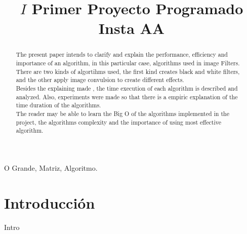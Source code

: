 \documentclass[conference]{IEEEtran}
\begin{document}
\title{$ I$ Primer Proyecto Programado Insta AA}
\author{
\and
{}
}
\maketitle
\begin{abstract}
The present paper intends to clarify and explain the performance, efficiency and importance of an algorithm, in this particular case, algorithms used in image Filters. \\ There are two kinds of algortihms used, the first kind creates black and white filters, and the other apply image convulsion to create different effects. \\Besides the explaining made , the time execution of each algorithm is described and analyzed. Also, experiments were made so that there is a empiric explanation of the time duration of the algorithms. \\The reader may be able to learn the Big O of the algorithms implemented in the project, the algorithms complexity and the importance of using most effective algorithm.
\end{abstract}
\begin{IEEEkeywords}
O Grande, Matriz, Algoritmo.
\end{IEEEkeywords}
\section{Introducci\'on}
Intro
\end{document}
